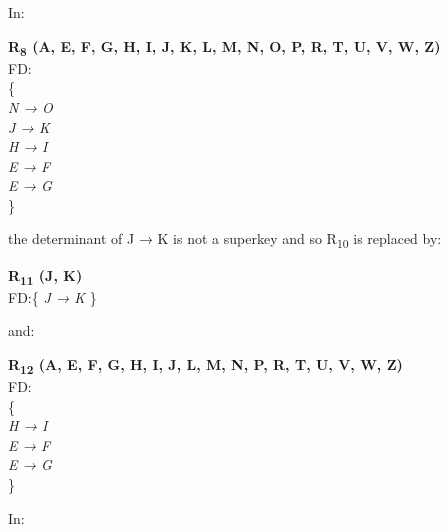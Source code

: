 



In:\\

\begin{adjustwidth}{2cm}{}
\textbf{R\textsubscript{8} (A, E, F, G, H, I, J, K, L, M, N, O, P, R, T, U, V, W, Z)}\\
FD:\\
\{\\
\textit{ 
N → O\\
J → K\\
H → I\\
E → F\\
E → G\\
}
\} \\
\end{adjustwidth}
























 

the determinant of J → K is not a superkey and so R\textsubscript{10} is replaced by:\\

\begin{adjustwidth}{2cm}{}
\textbf{R\textsubscript{11} (J, K)}\\
FD:\{
\textit{ 
J → K 
}
\} \\
\end{adjustwidth} 

and:\\

\begin{adjustwidth}{2cm}{}
\textbf{R\textsubscript{12} (A, E, F, G, H, I, J, L, M, N, P, R, T, U, V, W, Z)}\\
FD:\\
\{\\
\textit{ 
H → I\\
E → F\\
E → G\\
}
\} \\
\end{adjustwidth} 


In:\\

